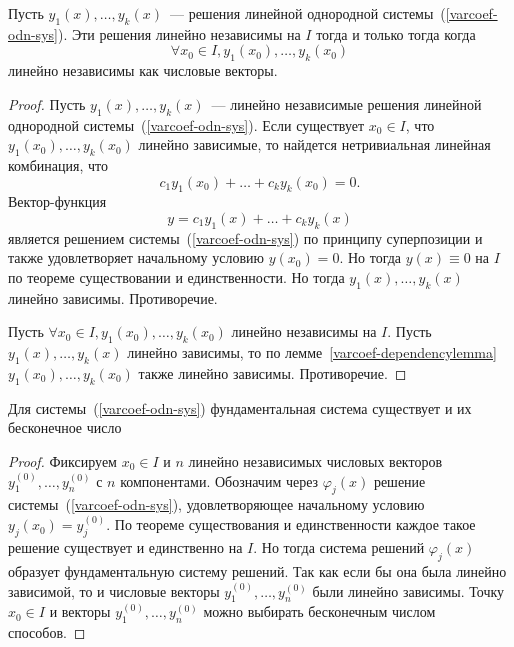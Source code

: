 \begin{theorem}\label{varcoef-dependencyth}
Пусть \(y_1(x), \ldots, y_k(x)\)~--- решения линейной однородной системы~(\ref{varcoef-odn-sys}). Эти решения линейно независимы на $I$ тогда и только тогда когда 
\[\forall x_0 \in I, y_1(x_0), \ldots, y_k(x_0)\]
линейно независимы как числовые векторы.
\end{theorem}
\begin{proof}
\fbox{$\Longrightarrow$} Пусть \(y_1(x), \ldots, y_k(x)\)~--- линейно независимые решения линейной однородной системы~(\ref{varcoef-odn-sys}). Если существует \(x_0 \in I\), что \(y_1(x_0), \ldots, y_k(x_0)\) линейно зависимые, то найдется нетривиальная линейная комбинация, что
\[c_1 y_1(x_0) + \ldots + c_k y_k(x_0) = 0.\]
Вектор-функция \[y = c_1 y_1(x) + \ldots + c_k y_k(x)\] является решением системы~(\ref{varcoef-odn-sys}) по принципу суперпозиции и также удовлетворяет начальному условию $y(x_0) = 0$. Но тогда $y(x) \equiv 0$ на $I$ по теореме существовании и единственности. Но тогда \(y_1(x), \ldots, y_k(x)\) линейно зависимы. Противоречие.

\fbox{$\Longleftarrow$} Пусть \(\forall x_0 \in I, y_1(x_0), \ldots, y_k(x_0)\) линейно независимы на $I$. Пусть \(y_1(x), \ldots, y_k(x)\) линейно зависимы, то по лемме~\ref{varcoef-dependencylemma} \(y_1(x_0), \ldots, y_k(x_0)\) также линейно зависимы. Противоречие.
\end{proof}

\begin{theorem}
Для системы~(\ref{varcoef-odn-sys}) фундаментальная система существует и их бесконечное число 
\end{theorem}
\begin{proof}
Фиксируем $x_0 \in I$ и $n$ линейно независимых числовых векторов \(y_1^{(0)}, \ldots, y_n^{(0)}\) с $n$ компонентами. Обозначим через $\varphi_j(x)$ решение системы~(\ref{varcoef-odn-sys}), удовлетворяющее начальному условию $y_j(x_0) = y_j^{(0)}$. По теореме существования и единственности каждое такое решение существует и единственно на $I$. Но тогда система решений $\varphi_j(x)$ образует фундаментальную систему решений. Так как если бы она была линейно зависимой, то и числовые векторы \(y_1^{(0)}, \ldots, y_n^{(0)}\) были линейно зависимы. Точку $x_0 \in I$ и векторы \(y_1^{(0)}, \ldots, y_n^{(0)}\) можно выбирать бесконечным числом способов.
\end{proof}

